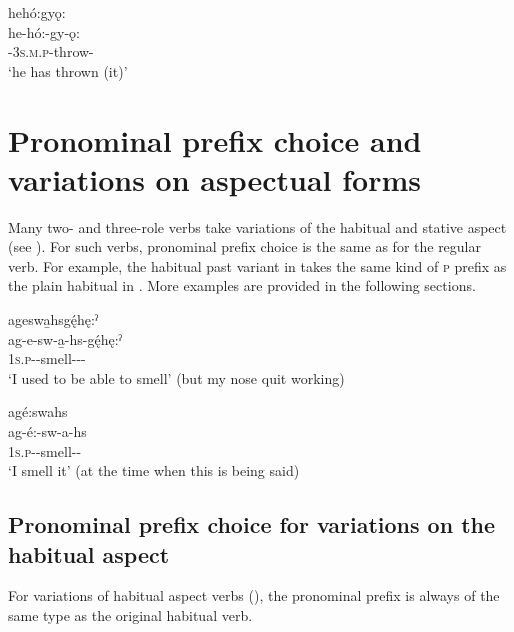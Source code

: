 \ex hehó:gyǫ:\\
\gll he-hó:-gy-ǫ:\\
 {\translocative}-\textsc{3s.m.p}-throw-{\stative}\\
\glt `he has thrown (it)'
\z
\z

\section{Pronominal prefix choice and variations on aspectual forms} \label{Pronominal prefix choice and variations on aspectual forms}
Many two- and three-role verbs take variations of the habitual and stative aspect (see ). For such verbs, pronominal prefix choice is the same as for the regular verb. For example, the habitual past variant in  takes the same kind of \textsc{p} prefix as the plain habitual in . More examples are provided in the following sections.

\ea\label{ex:3aspvarex}
\ea ageswa̱hsgę́hę:ˀ\\\label{ex:3aspvarexa}
\gll ag-e-sw-a̱-hs-gę́hę:ˀ\\
\textsc{1s.p}-{\joinerE}-smell-{\joinerA}-{\habitual}-{\past}\\
\glt ‘I used to be able to smell’ (but my nose quit working)

\ex agé:swahs\\\label{ex:3aspvarexb}
\gll ag-é:-sw-a-hs\\
\textsc{1s.p}-{\joinerE}-smell-{\joinerA}-{\habitual}\\
\glt ‘I smell it’ (at the time when this is being said)
\z
\z


\subsection{Pronominal prefix choice for variations on the habitual aspect} \label{Pronominal prefix selection for variations on the habitual aspect}
For variations of habitual aspect verbs (), the pronominal prefix is always of the same type as the original habitual verb.

